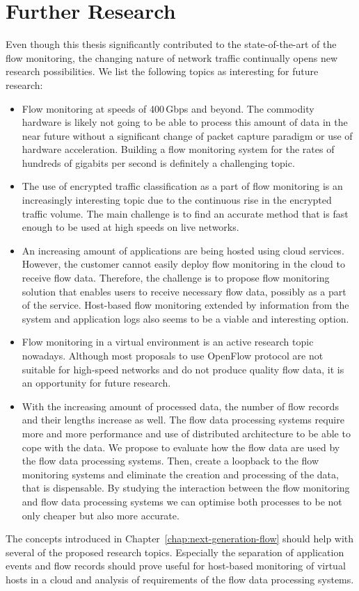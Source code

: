 \section{Further Research}

Even though this thesis significantly contributed to the state-of-the-art of the flow monitoring, the changing nature of network traffic continually opens new research possibilities. We list the following topics as interesting for future research:

\begin{itemize}
  \item Flow monitoring at speeds of 400\,Gbps and beyond. The commodity hardware is likely not going to be able to process this amount of data in the near future without a significant change of packet capture paradigm or use of hardware acceleration. Building a flow monitoring system for the rates of hundreds of gigabits per second is definitely a challenging topic.
  \item The use of encrypted traffic classification as a part of flow monitoring is an increasingly interesting topic due to the continuous rise in the encrypted traffic volume. The main challenge is to find an accurate method that is fast enough to be used at high speeds on live networks.
  \item An increasing amount of applications are being hosted using cloud services. However, the customer cannot easily deploy flow monitoring in the cloud to receive flow data. Therefore, the challenge is to propose flow monitoring solution that enables users to receive necessary flow data, possibly as a part of the service. Host-based flow monitoring extended by information from the system and application logs also seems to be a viable and interesting option.
  \item Flow monitoring in a virtual environment is an active research topic nowadays. Although most proposals to use OpenFlow protocol are not suitable for high-speed networks and do not produce quality flow data, it is an opportunity for future research.
  \item With the increasing amount of processed data, the number of flow records and their lengths increase as well. The flow data processing systems require more and more performance and use of distributed architecture to be able to cope with the data. We propose to evaluate how the flow data are used by the flow data processing systems. Then, create a loopback to the flow monitoring systems and eliminate the creation and processing of the data, that is dispensable. By studying the interaction between the flow monitoring and flow data processing systems we can optimise both processes to be not only cheaper but also more accurate.
\end{itemize}

The concepts introduced in Chapter~\ref{chap:next-generation-flow} should help with several of the proposed research topics. Especially the separation of application events and flow records should prove useful for host-based monitoring of virtual hosts in a cloud and analysis of requirements of the flow data processing systems.